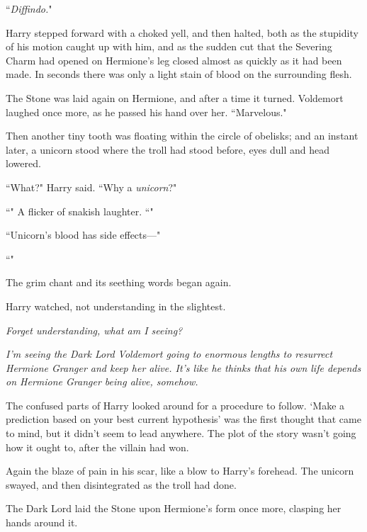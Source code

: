 ``\emph{Diffindo.}"

Harry stepped forward with a choked yell, and then halted, both as the stupidity of his motion caught up with him, and as the sudden cut that the Severing Charm had opened on Hermione's leg closed almost as quickly as it had been made. In seconds there was only a light stain of blood on the surrounding flesh.

The Stone was laid again on Hermione, and after a time it turned. Voldemort laughed once more, as he passed his hand over her. ``Marvelous."

Then another tiny tooth was floating within the circle of obelisks; and an instant later, a unicorn stood where the troll had stood before, eyes dull and head lowered.

``What?" Harry said. ``Why a \emph{unicorn}?"

``" A flicker of snakish laughter. ``"

``Unicorn's blood has side effects—"

``"

The grim chant and its seething words began again.

Harry watched, not understanding in the slightest.

\emph{Forget understanding, what am I seeing?}

\emph{I'm seeing the Dark Lord Voldemort going to enormous lengths to resurrect Hermione Granger and keep her alive. It's like he thinks that his own life depends on Hermione Granger being alive, somehow.}

The confused parts of Harry looked around for a procedure to follow. `Make a prediction based on your best current hypothesis' was the first thought that came to mind, but it didn't seem to lead anywhere. The plot of the story wasn't going how it ought to, after the villain had won.

Again the blaze of pain in his scar, like a blow to Harry's forehead. The unicorn swayed, and then disintegrated as the troll had done.

The Dark Lord laid the Stone upon Hermione's form once more, clasping her hands around it.

